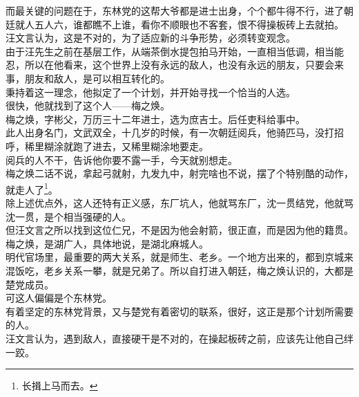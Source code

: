 \begin{multicols}{\theparacolNo}
而最关键的问题在于，东林党的这帮大爷都是进士出身，个个都牛得不行，进了朝廷就人五人六，谁都瞧不上谁，看你不顺眼也不客套，恨不得操板砖上去就拍。\\

汪文言认为，这是不对的，为了适应新的斗争形势，必须转变观念。\\

由于汪先生之前在基层工作，从端茶倒水提包拍马开始，一直相当低调，相当能忍，所以在他看来，这个世界上没有永远的敌人，也没有永远的朋友，只要会来事，朋友和敌人，是可以相互转化的。\\

秉持着这一理念，他拟定了一个计划，并开始寻找一个恰当的人选。\\

很快，他就找到了这个人——梅之焕。\\

梅之焕，字彬父，万历三十二年进士，选为庶吉士。后任吏科给事中。\\

此人出身名门，文武双全，十几岁的时候，有一次朝廷阅兵，他骑匹马，没打招呼，稀里糊涂就跑了进去，又稀里糊涂地要走。\\

阅兵的人不干，告诉他你要不露一手，今天就别想走。\\

梅之焕二话不说，拿起弓就射，九发九中，射完啥也不说，摆了个特别酷的动作，就走人了\footnote{长揖上马而去。}。\\

除上述优点外，这人还特有正义感，东厂坑人，他就骂东厂，沈一贯结党，他就骂沈一贯，是个相当强硬的人。\\

但汪文言之所以找到这位仁兄，不是因为他会射箭，很正直，而是因为他的籍贯。\\

梅之焕，是湖广人，具体地说，是湖北麻城人。\\

明代官场里，最重要的两大关系，就是师生、老乡。一个地方出来的，都到京城来混饭吃，老乡关系一攀，就是兄弟了。所以自打进入朝廷，梅之焕认识的，大都是楚党成员。\\

可这人偏偏是个东林党。\\

有着坚定的东林党背景，又与楚党有着密切的联系，很好，这正是那个计划所需要的人。\\

汪文言认为，遇到敌人，直接硬干是不对的，在操起板砖之前，应该先让他自己绊一跤。\\


\end{multicols}
